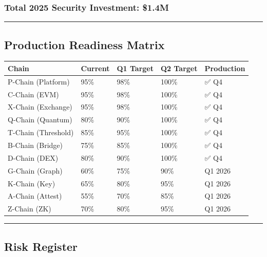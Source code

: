 \documentclass[
]{article}
\newcounter{none} %
\begin{document}
\subsubsection{\texorpdfstring{\textbf{Total 2025 Security Investment:
\$1.4M}}{Total 2025 Security Investment: \$1.4M}}\label{total-2025-security-investment-14m}

\begin{center}\rule{0.5\linewidth}{0.5pt}\end{center}

\subsection{Production Readiness
Matrix}\label{production-readiness-matrix}

{\def\LTcaptype{none} %
\begin{longtable}[]{@{}lllll@{}}
\toprule\noalign{}
Chain & Current & Q1 Target & Q2 Target & Production \\
\midrule\noalign{}
\endhead
\bottomrule\noalign{}
\endlastfoot
P-Chain (Platform) & 95\% & 98\% & 100\% & ✅ Q4 \\
C-Chain (EVM) & 95\% & 98\% & 100\% & ✅ Q4 \\
X-Chain (Exchange) & 95\% & 98\% & 100\% & ✅ Q4 \\
Q-Chain (Quantum) & 80\% & 90\% & 100\% & ✅ Q4 \\
T-Chain (Threshold) & 85\% & 95\% & 100\% & ✅ Q4 \\
B-Chain (Bridge) & 75\% & 85\% & 100\% & ✅ Q4 \\
D-Chain (DEX) & 80\% & 90\% & 100\% & ✅ Q4 \\
G-Chain (Graph) & 60\% & 75\% & 90\% & Q1 2026 \\
K-Chain (Key) & 65\% & 80\% & 95\% & Q1 2026 \\
A-Chain (Attest) & 55\% & 70\% & 85\% & Q1 2026 \\
Z-Chain (ZK) & 70\% & 80\% & 95\% & Q1 2026 \\
\end{longtable}
}

\begin{center}\rule{0.5\linewidth}{0.5pt}\end{center}

\subsection{Risk Register}\label{risk-register}
\end{document}
